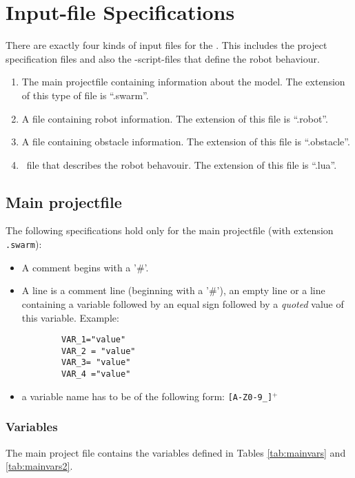 
\section{Input-file Specifications}

There are exactly four kinds of input files for the \RSS. This includes the project specification files and also the \Lua-script-files that define the robot behaviour.
\begin{enumerate}
	\item The main projectfile containing information about the model. The extension of this type of file is "`.swarm"'.
	\item A file containing robot information. The extension of this file is "`.robot"'.
	\item A file containing obstacle information. The extension of this file is "`.obstacle"'.
	\item \Lua\ file that describes the robot behavouir. The extension of this file is "`.lua"'.
\end{enumerate}


\subsection{Main projectfile}
The following specifications hold only for the main projectfile (with extension \texttt{.swarm}):
\begin{itemize}
	\item A comment begins with a '\#'.
	\item A line is a comment line (beginning with a '\#'), an empty line or a line containing a variable followed by an equal sign followed by a \emph{quoted} value of this variable. Example:
	\begin{verbatim}
		VAR_1="value"
		VAR_2 = "value"
		VAR_3= "value"
		VAR_4 ="value"
	\end{verbatim}
	\item a variable name has to be of the following form: \texttt{[A-Z0-9\_]$^+$}
\end{itemize}


\subsubsection{Variables}
The main project file contains the variables defined in Tables \ref{tab:mainvars} and \ref{tab:mainvars2}.
	

